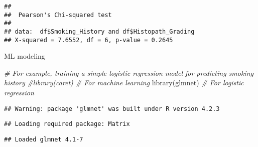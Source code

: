 \documentclass[
]{article}
\newenvironment{Shaded}{\begin{snugshade}}{\end{snugshade}}
\newcommand{\CommentTok}[1]{\textcolor[rgb]{0.56,0.35,0.01}{\textit{#1}}}
\newcommand{\FunctionTok}[1]{\textcolor[rgb]{0.00,0.00,0.00}{#1}}
\newcommand{\NormalTok}[1]{#1}
\begin{document}
\begin{verbatim}
## 
##  Pearson's Chi-squared test
## 
## data:  df$Smoking_History and df$Histopath_Grading
## X-squared = 7.6552, df = 6, p-value = 0.2645
\end{verbatim}

ML modeling

\begin{Shaded}
\begin{Highlighting}[]
\CommentTok{\# For example, training a simple logistic regression model for predicting smoking history}
\CommentTok{\#library(caret)     \# For machine learning}
\FunctionTok{library}\NormalTok{(glmnet)    }\CommentTok{\# For logistic regression}
\end{Highlighting}
\end{Shaded}

\begin{verbatim}
## Warning: package 'glmnet' was built under R version 4.2.3
\end{verbatim}

\begin{verbatim}
## Loading required package: Matrix
\end{verbatim}

\begin{verbatim}
## Loaded glmnet 4.1-7
\end{verbatim}
\end{document}
